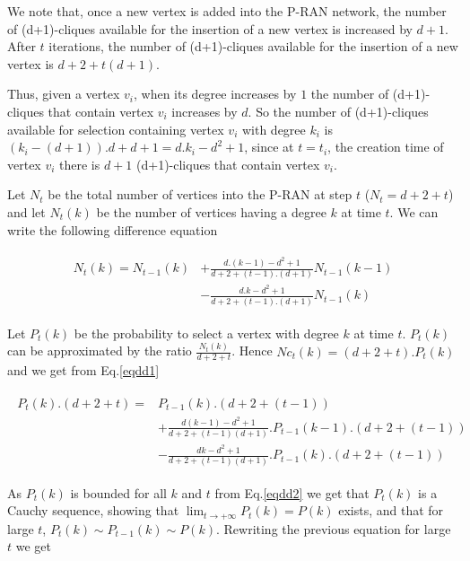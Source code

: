 \documentclass[11pt]{iopart}
\newenvironment{proof}[1][Proof]{\begin{trivlist}
    \item[\hskip \labelsep {\bfseries #1}]}{\end{trivlist}}
\begin{document}
\begin{proof}
We note that, once a new vertex is added into the P-RAN network, the number of (d+1)-cliques available for the insertion of a new vertex is increased by $d+1$. After $t$ iterations, the number of (d+1)-cliques  available for the insertion of a new vertex is $d+2+t(d+1)$. 

Thus, given a vertex $v_i$, when its degree increases by $1$ the number of (d+1)-cliques that contain vertex $v_i$ increases by $d$. So the number of (d+1)-cliques available for selection containing vertex $v_i$  with degree $k_i$ is $(k_i - (d+1)).d+d+1 = d.k_i-d^2+1$, since at $t=t_i$, the creation time of vertex $v_i$ there is $d+1$ (d+1)-cliques that contain vertex $v_i$. 


Let $N_t$ be the total number of vertices into the P-RAN at step $t$ ($N_t = d+2+t$) and let $N_t(k)$ be the number of vertices having a degree $k$ at time $t$. We can write the following difference equation

\begin{eqnarray}
\label{eqdd1}
 \begin{array}{ll}
 N_t(k) = N_{t-1}(k) &+ \frac{d.(k-1)-d^2+1}{d+2+(t-1).(d+1)}N_{t-1}(k-1)\\
                  &- \frac{d.k-d^2+1}{d+2+(t-1).(d+1)}N_{t-1}(k)
 \end{array}
\end{eqnarray} 
 
Let $P_t(k)$ be the probability to select a vertex with  degree $k$ at time $t$. $P_t(k)$ can be approximated by the ratio $\frac{N_t(k)}{d+2+t}$. Hence $Nc_t(k)=(d+2+t).P_t(k)$ and we get from Eq.\ref{eqdd1}

\begin{eqnarray}
\label{eqdd2}
 \begin{array}{ll}
P_t(k).(d+2+t) = &P_{t-1}(k).(d+2+(t-1)) \\ 
& + \frac{d(k-1)-d^2+1}{d+2+(t-1)(d+1)}.P_{t-1}(k-1).(d+2+(t-1)) \\
& - \frac{dk-d^2+1}{d+2+(t-1)(d+1)}.P_{t-1}(k).(d+2+(t-1)) 
 \end{array}
\end{eqnarray} 

As $P_t(k)$ is bounded for all $k$ and $t$ from Eq.\ref{eqdd2} we get that $P_t(k)$ is a Cauchy sequence, showing that $\lim_{t \to +\infty} P_t(k)=P(k)$ exists, and that for large $t$, $P_t(k) \sim P_{t-1}(k) \sim P(k)$. Rewriting the previous equation for large $t$ we get


\end{proof}
\end{document}
